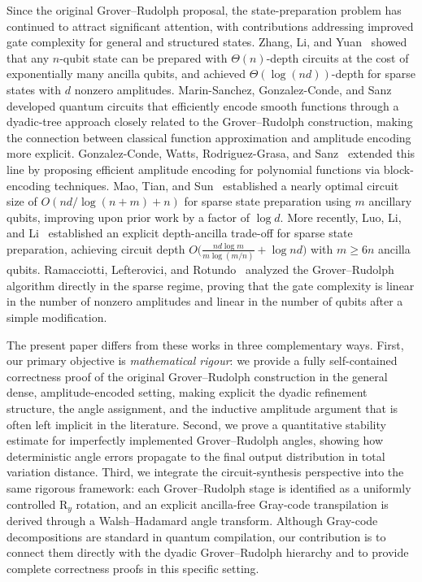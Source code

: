 \documentclass{article}
\newcommand{\RY}{\mathrm{R}_y}
\numberwithin{equation}{section}
\begin{document}
Since the original Grover--Rudolph proposal, the state-preparation problem has continued to attract significant attention, with contributions addressing improved gate complexity for general and structured states.
Zhang, Li, and Yuan~\cite{Zhang2022} showed that any $n$-qubit state can be prepared with $\Theta(n)$-depth circuits at the cost of exponentially many ancilla qubits, and achieved $\Theta(\log(nd))$-depth for sparse states with $d$ nonzero amplitudes.
Marin-Sanchez, Gonzalez-Conde, and Sanz~\cite{MarinSanchez2023} developed quantum circuits that efficiently encode smooth functions through a dyadic-tree approach closely related to the Grover--Rudolph construction, making the connection between classical function approximation and amplitude encoding more explicit.
Gonzalez-Conde, Watts, Rodriguez-Grasa, and Sanz~\cite{GonzalezConde2024} extended this line by proposing efficient amplitude encoding for polynomial functions via block-encoding techniques.
Mao, Tian, and Sun~\cite{Mao2024} established a nearly optimal circuit size of $O(nd/\log(n+m)+n)$ for sparse state preparation using $m$ ancillary qubits, improving upon prior work by a factor of $\log d$.
More recently, Luo, Li, and Li~\cite{Luo2025} established an explicit depth-ancilla trade-off for sparse state preparation, achieving circuit depth $O\!\bigl(\frac{nd\log m}{m\log(m/n)}+\log nd\bigr)$ with $m\ge 6n$ ancilla qubits.
Ramacciotti, Lefterovici, and Rotundo~\cite{Ramacciotti2024} analyzed the Grover--Rudolph algorithm directly in the sparse regime, proving that the gate complexity is linear in the number of nonzero amplitudes and linear in the number of qubits after a simple modification.

The present paper differs from these works in three complementary ways.
First, our primary objective is \emph{mathematical rigour}: we provide a fully self-contained correctness
proof of the original Grover--Rudolph construction in the general dense, amplitude-encoded setting,
making explicit the dyadic refinement structure, the angle assignment, and the inductive amplitude
argument that is often left implicit in the literature.
Second, we prove a quantitative stability estimate for imperfectly implemented Grover--Rudolph angles,
showing how deterministic angle errors propagate to the final output distribution in total variation
distance.
Third, we integrate the circuit-synthesis perspective into the same rigorous framework: each
Grover--Rudolph stage is identified as a uniformly controlled \(\RY\) rotation, and an explicit
ancilla-free Gray-code transpilation is derived through a Walsh--Hadamard angle transform. Although
Gray-code decompositions are standard in quantum compilation, our contribution is to connect them
directly with the dyadic Grover--Rudolph hierarchy and to provide complete correctness proofs in this
specific setting.
\end{document}
